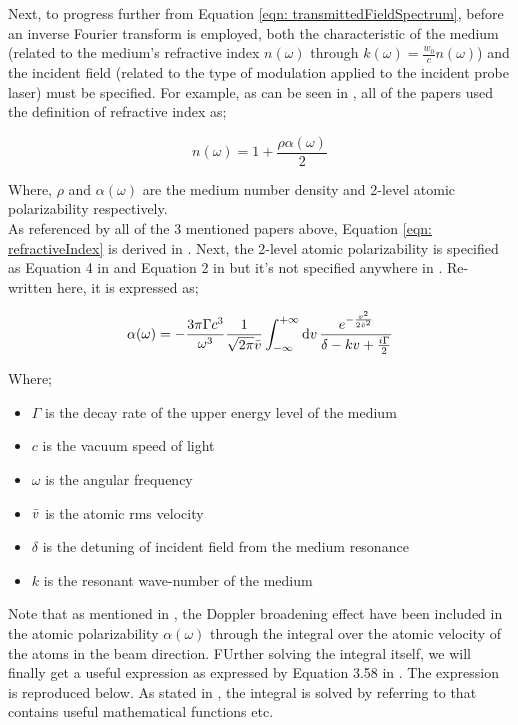Next, to progress further from Equation \ref{eqn: transmittedFieldSpectrum}, before an inverse Fourier transform is employed, both the characteristic of the medium (related to the medium's refractive index $n(\omega)$ through $k(\omega) = \frac{w_{0}}{c} n(\omega)$) and the incident field (related to the type of modulation applied to the incident probe laser) must be specified. For example, as can be seen in \cite{Chalony2011, Kwong2014, Kwong2015}, all of the papers used the definition of refractive index as;

\begin{equation}
    n(\omega) = 1 + \frac{\rho \alpha(\omega)}{2}
    \label{eqn: refractiveIndex}
\end{equation}

Where, $\rho$ and $\alpha(\omega)$ are the medium number density and 2-level atomic polarizability respectively.\\

As referenced by all of the 3 mentioned papers above, Equation \ref{eqn: refractiveIndex} is derived in \cite{Hecht}. Next, the 2-level atomic polarizability is specified as Equation 4 in \cite{Kwong2014} and Equation 2 in \cite{Kwong2015} but it's not specified anywhere in \cite{Chalony2011}. Re-written here, it is expressed as;

\begin{equation}
    \alpha(\omega) = -\frac{3\pi\Gamma c^{3}}{\omega^{3}} \frac{1}{\sqrt{2\pi}\Bar{v}} \int_{-\infty}^{+\infty} \dd{v} \frac{e^{-\frac{v^{2}}{2\Bar{v}^{2}}}}{\delta - kv + \frac{i\Gamma}{2}}
    \label{eqn: alphaGeneral}
\end{equation}

Where;

\begin{itemize}
    \item $\Gamma$ is the decay rate of the upper energy level of the medium
    \item $c$ is the vacuum speed of light
    \item $\omega$ is the angular frequency
    \item $\Bar{v}$ is the atomic rms velocity 
    \item $\delta$ is the detuning of incident field from the medium resonance
    \item $k$ is the resonant wave-number of the medium
\end{itemize}

Note that as mentioned in \cite{Kwong2014, Kwong2015}, the Doppler broadening effect have been included in the atomic polarizability $\alpha(\omega)$ through the integral over the atomic velocity of the atoms in the beam direction. FUrther solving the integral itself, we will finally get a useful expression as expressed by Equation 3.58 in \cite{Kwong2017}. The expression is reproduced below. As stated in \cite{Kwong2017}, the integral is solved by referring to \cite{10.5555/1098650} that contains useful mathematical functions etc.

